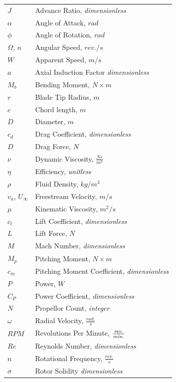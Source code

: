 \documentclass[journal ]{new-aiaa}
\begin{document}
{\renewcommand\arraystretch{1.0}
\noindent\begin{longtable*}{@{}l @{\quad=\quad} l@{}}

$J$ & Advance Ratio, \emph{dimensionless} \\
$\alpha$ & Angle of Attack, $rad$ \\
$\phi$ & Angle of Rotation, $rad$ \\
$\Omega$, $n$ & Angular Speed, $rev./s$ \\
$W$ & Apparent Speed, $m/s$ \\
$a$ & Axial Induction Factor \emph{dimensionless} \\
$M_{b}$ & Bending Moment, $N \times m$ \\
$r$ & Blade Tip Radius, $m$ \\
$c$ & Chord length, $m$ \\
$D$ & Diameter, $m$ \\
$c_{d}$ & Drag Coefficient, \emph{dimensionless} \\
$D$ & Drag Force, $N$ \\
$\nu$ & Dynamic Viscosity, $\frac{N s}{m^{2}}$ \\
$\eta$ & Efficiency, \emph{unitless} \\
$\rho$ & Fluid Density, $kg/m^{3}$ \\
$v_{a}$, $U_{\infty}$ & Freestream Velocity, $m/s$ \\
$\mu$ & Kinematic Viscosity, $m^{2}/s$ \\
$c_{l}$ & Lift Coefficient, \emph{dimensionless} \\
$L$ & Lift Force, $N$ \\
$M$ & Mach Number, \emph{dimensionless} \\
$M_{p}$ & Pitching Moment, $N \times m$ \\
$c_{m}$ & Pitching Moment Coefficient, \emph{dimensionless} \\
$P$ & Power, $W$ \\
$C_{P}$ & Power Coefficient, \emph{dimensionless} \\
$N$ & Propellor Count, \emph{integer} \\
$\omega$ & Radial Velocity, $\frac{rad.}{s}$ \\
$RPM$ & Revolutions Per Minute, $\frac{\emph{rev.}}{\emph{min.}}$ \\
$Re$ & Reynolds Number, \emph{dimensionless} \\
$n$ & Rotational Frequency, $\frac{rev.}{s}$ \\
$\sigma$ & Rotor Solidity \emph{dimensionless} \\

\end{longtable*}}
\end{document}
